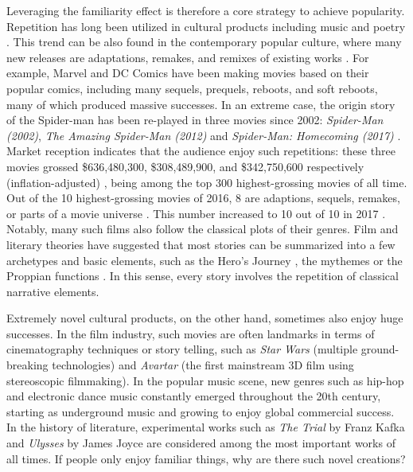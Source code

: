 \documentclass[letterpaper]{article} %
\begin{document}
Leveraging the familiarity effect is therefore a core strategy to achieve popularity. Repetition has long been utilized in cultural products including music and poetry \cite{huron2013psychological}. This trend can be also found in the contemporary popular culture, where many new releases are adaptations, remakes, and remixes of existing works \cite{manovich2007comes}. For example, Marvel and DC Comics have been making movies based on their popular comics, including many sequels, prequels, reboots, and soft reboots, many of which produced massive successes. In an extreme case, the origin story of the Spider-man has been re-played in three movies since 2002: \emph{Spider-Man (2002)}, \emph{The Amazing Spider-Man (2012)} and \emph{Spider-Man: Homecoming (2017)} \cite{spiderman}. Market reception indicates that the audience enjoy such repetitions: these three movies grossed \$636,480,300, \$308,489,900, and \$342,750,600 respectively (inflation-adjusted) \cite{spider-gross}, being among the top 300 highest-grossing movies of all time. Out of the 10 highest-grossing movies of 2016, 8 are adaptions, sequels, remakes, or parts of a movie universe \cite{2016film}. This number increased to 10 out of 10 in 2017 \cite{2017film}. Notably, many such films also follow the classical plots of their genres. Film and literary theories have suggested that most stories can be summarized into a few archetypes and basic elements, such as the Hero's Journey \cite{campbell2008hero}, the mythemes \cite{levi1955structural} or the Proppian functions \cite{propp2010morphology}. In this sense, every story involves the repetition of classical narrative elements.

Extremely novel cultural products, on the other hand, sometimes also enjoy huge successes. In the film industry, such movies are often landmarks in terms of cinematography techniques or story telling, such as \emph{Star Wars} (multiple ground-breaking technologies) and \emph{Avartar} (the first mainstream 3D film using stereoscopic filmmaking). In the popular music scene, new genres such as hip-hop and electronic dance music constantly emerged throughout the 20th century, starting as underground music and growing to enjoy global commercial success. In the history of literature, experimental works such as \emph{The Trial} by Franz Kafka and \emph{Ulysses} by James Joyce are considered among the most important works of all times. If people only enjoy familiar things, why are there such novel creations?
\end{document}
